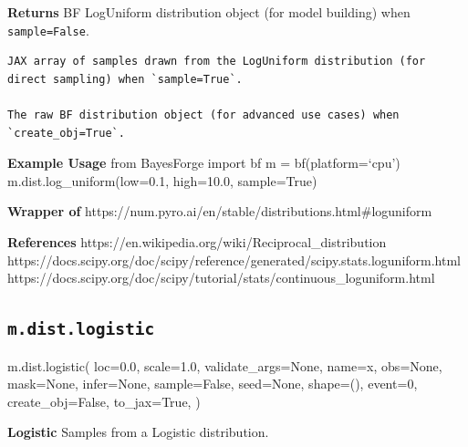 \documentclass[
  letterpaper,
  DIV=11,
  numbers=noendperiod]{scrartcl}
\newenvironment{Shaded}{\begin{snugshade}}{\end{snugshade}}
\newcommand{\DecValTok}[1]{\textcolor[rgb]{0.68,0.00,0.00}{#1}}
\newcommand{\FloatTok}[1]{\textcolor[rgb]{0.68,0.00,0.00}{#1}}
\newcommand{\NormalTok}[1]{\textcolor[rgb]{0.00,0.23,0.31}{#1}}
\newcommand{\OperatorTok}[1]{\textcolor[rgb]{0.37,0.37,0.37}{#1}}
\newcommand{\StringTok}[1]{\textcolor[rgb]{0.13,0.47,0.30}{#1}}
\newcommand{\VariableTok}[1]{\textcolor[rgb]{0.07,0.07,0.07}{#1}}
\begin{document}
\textbf{Returns} BF LogUniform distribution object (for model building)
when \texttt{sample=False}.

\begin{verbatim}
JAX array of samples drawn from the LogUniform distribution (for direct sampling) when `sample=True`.

The raw BF distribution object (for advanced use cases) when `create_obj=True`.
\end{verbatim}

\textbf{Example Usage} from BayesForge import bf m = bf(platform=`cpu')
m.dist.log\_uniform(low=0.1, high=10.0, sample=True)

\textbf{Wrapper of}
https://num.pyro.ai/en/stable/distributions.html\#loguniform

\textbf{References}
https://en.wikipedia.org/wiki/Reciprocal\_distribution
https://docs.scipy.org/doc/scipy/reference/generated/scipy.stats.loguniform.html
https://docs.scipy.org/doc/scipy/tutorial/stats/continuous\_loguniform.html

\subsection{\texorpdfstring{\texttt{m.dist.logistic}}{m.dist.logistic}}\label{logistic}

\begin{Shaded}
\begin{Highlighting}[]
\NormalTok{m.dist.logistic(}
\NormalTok{    loc}\OperatorTok{=}\FloatTok{0.0}\NormalTok{,}
\NormalTok{    scale}\OperatorTok{=}\FloatTok{1.0}\NormalTok{,}
\NormalTok{    validate\_args}\OperatorTok{=}\VariableTok{None}\NormalTok{,}
\NormalTok{    name}\OperatorTok{=}\StringTok{\textquotesingle{}x\textquotesingle{}}\NormalTok{,}
\NormalTok{    obs}\OperatorTok{=}\VariableTok{None}\NormalTok{,}
\NormalTok{    mask}\OperatorTok{=}\VariableTok{None}\NormalTok{,}
\NormalTok{    infer}\OperatorTok{=}\VariableTok{None}\NormalTok{,}
\NormalTok{    sample}\OperatorTok{=}\VariableTok{False}\NormalTok{,}
\NormalTok{    seed}\OperatorTok{=}\VariableTok{None}\NormalTok{,}
\NormalTok{    shape}\OperatorTok{=}\NormalTok{(),}
\NormalTok{    event}\OperatorTok{=}\DecValTok{0}\NormalTok{,}
\NormalTok{    create\_obj}\OperatorTok{=}\VariableTok{False}\NormalTok{,}
\NormalTok{    to\_jax}\OperatorTok{=}\VariableTok{True}\NormalTok{,}
\NormalTok{)}
\end{Highlighting}
\end{Shaded}

\textbf{Logistic} Samples from a Logistic distribution.
\end{document}
